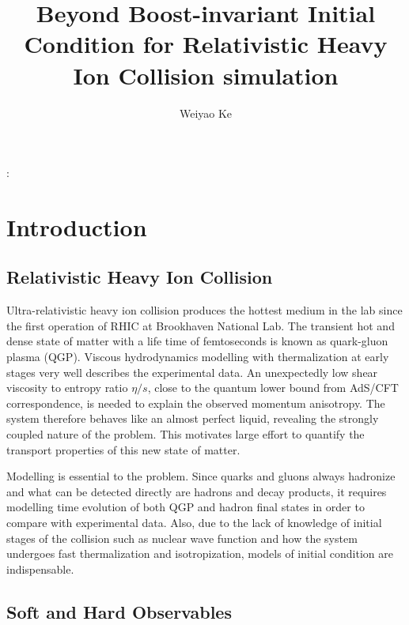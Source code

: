 \documentclass[10pt,a4paper, twocolumn]{article}
\begin{document}
\title{Beyond Boost-invariant Initial Condition for Relativistic Heavy Ion Collision simulation}
\author{Weiyao Ke}
\maketitle


\abstractname{:}

\section{Introduction}
	\subsection{Relativistic Heavy Ion Collision}
	Ultra-relativistic heavy ion collision produces the hottest medium in the lab since the first operation of RHIC at Brookhaven National Lab. 
	The transient hot and dense state of matter with a life time of femtoseconds is known as quark-gluon plasma (QGP). 
	Viscous hydrodynamics modelling with thermalization at early stages very well describes the experimental data. 
	An unexpectedly low shear viscosity to entropy ratio $\eta/s$, close to the quantum lower bound from AdS/CFT correspondence, is needed to explain the observed momentum anisotropy.
	The system therefore behaves like an almost perfect liquid, revealing the strongly coupled nature of the problem.
	This motivates large effort to quantify the transport properties of this new state of matter.
	
	Modelling is essential to the problem. 
	Since quarks and gluons always hadronize and what can be detected directly are hadrons and decay products, it requires modelling time evolution of both QGP and hadron final states in order to compare with experimental data. 
	Also, due to the lack of knowledge of initial stages of the collision such as nuclear wave function and how the system undergoes fast thermalization and isotropization, models of initial condition are indispensable.
	
	\subsection{Soft and Hard Observables}
		
	
\end{document}
